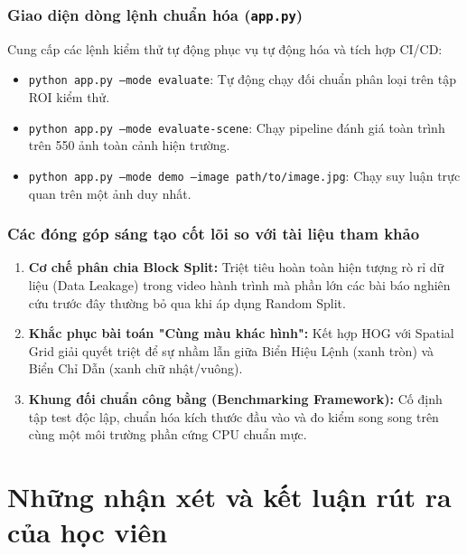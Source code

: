 \documentclass[a4paper, 11pt]{article}
\begin{document}
\subsubsection{Giao diện dòng lệnh chuẩn hóa (\texttt{app.py})}
\label{subsubsec:demo_cli}

Cung cấp các lệnh kiểm thử tự động phục vụ tự động hóa và tích hợp CI/CD:
\begin{itemize}
    \item \texttt{python app.py --mode evaluate}: Tự động chạy đối chuẩn phân loại trên tập ROI kiểm thử.
    \item \texttt{python app.py --mode evaluate-scene}: Chạy pipeline đánh giá toàn trình trên 550 ảnh toàn cảnh hiện trường.
    \item \texttt{python app.py --mode demo --image path/to/image.jpg}: Chạy suy luận trực quan trên một ảnh duy nhất.
\end{itemize}

\subsubsection{Các đóng góp sáng tạo cốt lõi so với tài liệu tham khảo}
\label{subsubsec:dong_gop_sang_tao}

\begin{enumerate}
    \item \textbf{Cơ chế phân chia Block Split:} Triệt tiêu hoàn toàn hiện tượng rò rỉ dữ liệu (Data Leakage) trong video hành trình mà phần lớn các bài báo nghiên cứu trước đây thường bỏ qua khi áp dụng Random Split.
    \item \textbf{Khắc phục bài toán "Cùng màu khác hình":} Kết hợp HOG với Spatial Grid giải quyết triệt để sự nhầm lẫn giữa Biển Hiệu Lệnh (xanh tròn) và Biển Chỉ Dẫn (xanh chữ nhật/vuông).
    \item \textbf{Khung đối chuẩn công bằng (Benchmarking Framework):} Cố định tập test độc lập, chuẩn hóa kích thước đầu vào và đo kiểm song song trên cùng một môi trường phần cứng CPU chuẩn mực.
\end{enumerate}

\section{Những nhận xét và kết luận rút ra của học viên}
\label{sec:ket_luan}
\end{document}
